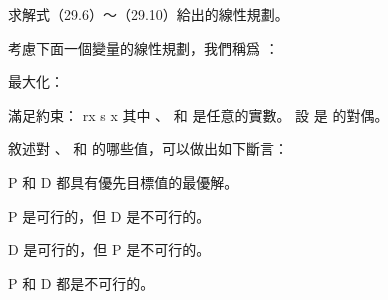 \startANSWER
{}
\stopANSWER

\startEXERCISE
求解式（29.6）～（29.10）給出的線性規劃。
\stopEXERCISE

\startANSWER
{}
\stopANSWER

\startEXERCISE
考慮下面一個變量的線性規劃，我們稱爲 ：

最大化： 

滿足約束：
\startformula\startmathalignment
\NC rx \NC \le s \NR
\NC x \NC {} \NR
\stopmathalignment\stopformula
其中 、  和  是任意的實數。
設  是  的對偶。

敘述對 、  和  的哪些值，可以做出如下斷言：
\startigBase[n]
\item P 和 D 都具有優先目標值的最優解。
\item P 是可行的，但 D 是不可行的。
\item D 是可行的，但 P 是不可行的。
\item P 和 D 都是不可行的。
\stopigBase
\stopEXERCISE

\startANSWER
{}
\stopANSWER

\stopsection
